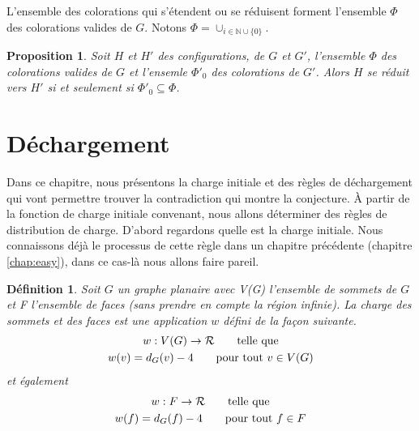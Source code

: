 \documentclass[10pt,a4paper]{article}
\newtheorem{definition}{Définition}
\newtheorem{proposition}{Proposition}
\begin{document}
L'ensemble des colorations qui s'étendent ou se réduisent forment l'ensemble  $\Phi$ des colorations valides de $G$. Notons $\Phi = \cup_{i \in \mathbb{N}\cup\{0\}}$. 


\begin{proposition}
Soit $H$ et $H'$ des configurations, de $G$ et $G'$, l'ensemble $\Phi$ des colorations valides de $G$ et l'ensemle $\Phi'_0$ des colorations de $G'$. Alors $H$ se réduit vers $H'$ si et seulement si $\Phi'_0 \subseteq \Phi$.
\end{proposition}
\bigskip



\section{Déchargement}
\label{chap:Dec}
Dans ce chapitre, nous présentons la charge initiale et des règles de déchargement qui vont permettre trouver la contradiction qui montre la conjecture. \` A partir de la fonction de charge initiale convenant, nous allons déterminer des règles de distribution de charge. D'abord regardons quelle est la charge initiale. Nous connaissons déjà le processus de cette règle dans un chapitre précédente (chapitre \ref{chap:easy}), dans ce cas-là nous allons faire pareil.

\begin{definition}
Soit $G$ un graphe planaire avec V(G) l'ensemble de sommets de $G$ et F l'ensemble de faces (sans prendre en compte la région infinie). La \emph{charge} des sommets et des faces est une application $w$ défini de la façon suivante.
$$
\gathered
w: V(G) \to \mathcal{R} \qquad \textrm{telle que}\\
w(v) = d_G(v) - 4 \qquad \textrm{pour tout $v \in V(G)$}\\
\endgathered
$$
et également
$$
\gathered
w: F \to \mathcal{R} \qquad \textrm{telle que}\\
w(f) = d_G(f) - 4 \qquad \textrm{pour tout $f \in F$}\\
\endgathered
$$
\end{definition}
\end{document}
